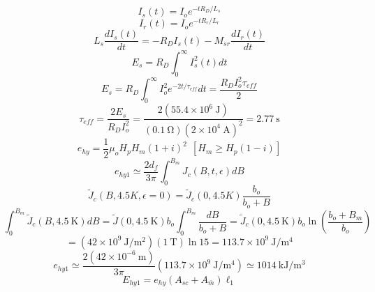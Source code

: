 \begin{equation}%
I_s(t)=I_oe^{-tR_D/L_s}
\end{equation}
\begin{equation}%
I_r(t)=I_oe^{-tR_r/L_r}
\end{equation}
\begin{equation}%
L_s\frac{dI_s(t)}{dt}=-R_DI_s(t)-M_{sr}\frac{dI_r(t)}{dt}
\end{equation}
\begin{equation}%
E_s=R_D\int_{0}^{\infty}I_s^2(t)dt
\end{equation}
\begin{equation}%
E_s=R_D\int_{0}^{\infty}I_{o}^2e^{-2t/\tau_{eff}}dt=\frac{R_DI_o^2\tau_{eff}}{2}
\end{equation}
\begin{equation}%
\tau_{eff}=\frac{2E_s}{R_DI_o^2}=\frac{2(55.4\times10^6\ \mathrm{J})}{(0.1\ \mathrm{\Omega})(2\times10^4\ \mathrm{A})^2}=2.77\ \mathrm{s}
\end{equation}
\begin{equation}%
e_{hy}=\frac{1}{2}\mu_oH_pH_m(1+i)^2\     \ [H_m\geq H_p(1-i)]
\end{equation}
\begin{equation}%
e_{hy1}\simeq\frac{2d_f}{3\pi}\int_{0}^{B_m}J_c(B,t,\epsilon)dB
\end{equation}
\begin{equation}%
\tilde{J}_c(B,4.5K,\epsilon=0)=\tilde{J}_c(0,4.5K)\frac{b_o}{b_o+B}
\end{equation}
\begin{equation}%
\int_{0}^{B_m}\tilde{J}_c(B,4.5\ \mathrm{K})dB=\tilde{J}(0,4.5\ \mathrm{K})b_o\int_{0}^{B_m}\frac{dB}{b_o+B}=\tilde{J}_c(0,4.5\ \mathrm{K})b_o\ln(\frac{b_o+B_m}{b_o})
\end{equation}
\begin{equation}%
=(42\times10^9\ \mathrm{J/m^2})(1\ \mathrm{T})\ln15=113.7\times10^9\ \mathrm{J/m^4}
\end{equation}
\begin{equation}%
e_{hy1}\simeq\frac{2(42\times10^{-6}\ \mathrm{m})}{3\pi}(113.7\times10^9\ \mathrm{J/m^4})\simeq1014\ \mathrm{kJ/m^3}
\end{equation}
\begin{equation}%
E_{hy1}=e_{hy}(A_{sc}+A_{\bar{m}})\ell_1
\end{equation}
